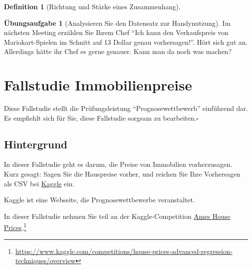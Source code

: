 \documentclass[
  a4paper,
  DIV=11]{scrreprt}
\theoremstyle{definition}
\newtheorem{exercise}{Übungsaufgabe}[chapter]
\theoremstyle{definition}
\theoremstyle{definition}
\newtheorem{definition}{Definition}[chapter]
\theoremstyle{remark}
\begin{document}
\begin{definition}[Richtung und Stärke eines
Zusammenhang]
\begin{exercise}[Analysieren Sie den Datensatz zur
Handynutzung]
Im nächsten Meeting erzählen Sie Ihrem Chef ``Ich kann den Verkaufspreis
von Mariokart-Spielen im Schnitt auf 13 Dollar genau vorhersagen!''.
Hört sich gut an. Allerdings hätte ihr Chef es gerne genauer. Kann man
da noch was machen?

\section{Fallstudie Immobilienpreise}\label{fallstudie-immobilienpreise}

\begin{tcolorbox}[enhanced jigsaw, leftrule=.75mm, opacitybacktitle=0.6, colback=white, colframe=quarto-callout-caution-color-frame, coltitle=black, colbacktitle=quarto-callout-caution-color!10!white, opacityback=0, left=2mm, breakable, titlerule=0mm, toptitle=1mm, bottomtitle=1mm, rightrule=.15mm, title=\textcolor{quarto-callout-caution-color}{\faFire}\hspace{0.5em}{Vorsicht}, arc=.35mm, bottomrule=.15mm, toprule=.15mm]

Diese Fallstudie stellt die Prüfungsleistung ``Prognosewettbewerb''
einführend dar. Es empfiehlt sich für Sie, diese Fallstudie sorgsam zu
bearbeiten.\(\square\)

\end{tcolorbox}

\subsection{Hintergrund}\label{hintergrund}

In dieser Fallstudie geht es darum, die Preise von Immobilien
vorherzusagen. Kurz gesagt: Sagen Sie die Hauspreise vorher, und reichen
Sie Ihre Vorhersagen als CSV bei \href{https://www.kaggle.com/}{Kaggle}
ein.

Kaggle ist eine Webseite, die Prognosewettbewerbe veranstaltet.

In dieser Fallstudie nehmen Sie teil an der Kaggle-Competition
\href{https://www.kaggle.com/competitions/house-prices-advanced-regression-techniques/overview}{Ames
House Prices}.\footnote{\url{https://www.kaggle.com/competitions/house-prices-advanced-regression-techniques/overview}}


\end{exercise}
\end{definition}
\end{document}
